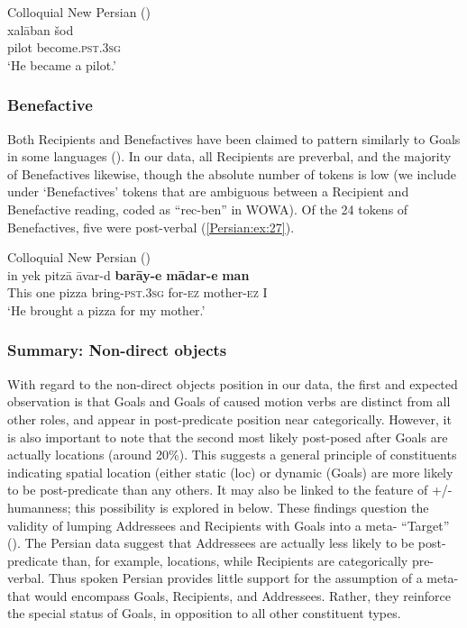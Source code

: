 \documentclass[output=paper,colorlinks,citecolor=brown,draftmode]{langscibook}
\begin{document}
\ea\label{Persian:ex:26}
Colloquial New Persian (\citealt[T, 2227]{Izadi2022Persian}) \\
\gll xalāban šod \\
pilot become\textsc{.pst.3sg} \\
\glt `He became a pilot.'
\z

\subsubsection{Benefactive}

Both Recipients and Benefactives have been claimed to pattern similarly to Goals in some languages (). In our data, all Recipients are preverbal, and the majority of Benefactives likewise, though the absolute number of tokens is low (we include under `Benefactives' tokens that are ambiguous between a Recipient and Benefactive reading, coded as ``rec-ben'' in WOWA). Of the 24 tokens of Benefactives, five were post-verbal (\ref{Persian:ex:27}).

\ea\label{Persian:ex:27}
Colloquial New Persian (\citealt[M, 1537]{Izadi2022Persian}) \\
\gll in yek pitzā āvar-d \textbf{barāy-e} \textbf{mādar-e} \textbf{man} \\
This one pizza bring\textsc{-pst.3sg} for\textsc{-ez} mother\textsc{-ez} I \\
\glt `He brought a pizza for my mother.'
\z

\subsubsection{Summary: Non-direct objects}

With regard to the non-direct objects position in our data, the first and expected observation is that Goals and Goals of caused motion verbs are distinct from all other roles, and appear in post-predicate position near categorically. However, it is also important to note that the second most likely post-posed  after Goals are actually locations (around 20\%). This suggests a general principle of constituents indicating spatial location (either static (loc) or dynamic (Goals) are more likely to be post-predicate than any others. It may also be linked to the feature of +/- humanness; this possibility is explored in  below. These findings question the validity of lumping Addressees and Recipients with Goals into a meta- ``Target'' (\citealt{asadpour_word_2022}). The Persian data suggest that Addressees are actually less likely to be post-predicate than, for example, locations, while Recipients are categorically pre-verbal. Thus spoken Persian provides little support for the assumption of a meta- that would encompass Goals, Recipients, and Addressees. Rather, they reinforce the special status of Goals, in opposition to all other constituent types.
\end{document}
